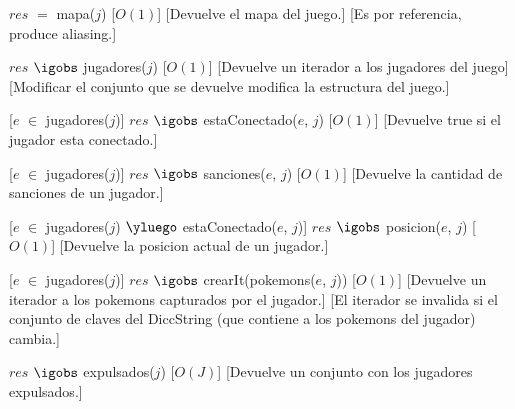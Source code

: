 \begin{Interfaz}

%
{$res$ $=$ mapa($j$)}%
[$O(1)$] %
[Devuelve el mapa del juego.]
[Es por referencia, produce aliasing.]


%
{$res$ $\igobs$ jugadores($j$)}%
[$O(1)$] %
[Devuelve un iterador a los jugadores del juego]
[Modificar el conjunto que se devuelve modifica la estructura del juego.]



%
[$e$ $\in$ jugadores($j$)]
{$res$ $\igobs$ estaConectado($e$, $j$)}%
[$O(1)$] %
[Devuelve true si el jugador esta conectado.]



%
[$e$ $\in$ jugadores($j$)]
{$res$ $\igobs$ sanciones($e$, $j$)}%
[$O(1)$] %
[Devuelve la cantidad de sanciones de un jugador.]



%
[$e$ $\in$ jugadores($j$)  $\yluego$ estaConectado($e$, $j$)]
{$res$ $\igobs$ posicion($e$, $j$)}%
[$O(1)$] %
[Devuelve la posicion actual de un jugador.]



%
[$e$ $\in$ jugadores($j$)]
{$res$ $\igobs$ crearIt(pokemons($e$, $j$))}%
[$O(1)$] %
[Devuelve un iterador a los pokemons capturados por el jugador.]
[El iterador se invalida si el conjunto de claves del DiccString (que contiene a los pokemons del jugador) cambia.]



%
{$res$ $\igobs$ expulsados($j$)}%
[$O(J)$]  
[Devuelve un conjunto con los jugadores expulsados.]



\end{Interfaz}
